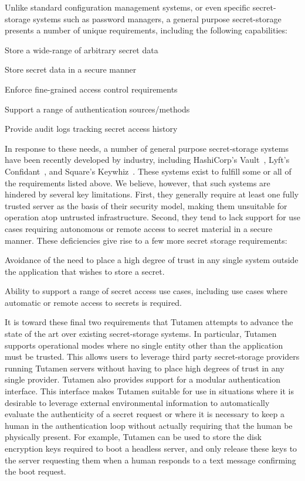 Unlike standard configuration management systems, or even specific
secret-storage systems such as password managers, a general purpose
secret-storage presents a number of unique requirements, including the
following capabilities:

\begin{packed_item}
\item Store a wide-range of arbitrary secret data
\item Store secret data in a secure manner
\item Enforce fine-grained access control requirements
\item Support a range of authentication sources/methods
\item Provide audit logs tracking secret access history
\end{packed_item}

In response to these needs, a number of general purpose secret-storage
systems have been recently developed by industry, including
HashiCorp's Vault~\cite{vault}, Lyft's Confidant~\cite{confidant}, and
Square's Keywhiz~\cite{keywhiz}. These systems exist to fulfill some
or all of the requirements listed above. We believe, however, that
such systems are hindered by several key limitations. First, they
generally require at least one fully trusted server as the basis of
their security model, making them unsuitable for operation atop
untrusted infrastructure. Second, they tend to lack support for use
cases requiring autonomous or remote access to secret material in a
secure manner. These deficiencies give rise to a few more secret
storage requirements:

\begin{packed_item}
\item Avoidance of the need to place a high degree of trust in any
  single system outside the application that wishes to store a secret.
\item Ability to support a range of secret access use cases, including
  use cases where automatic or remote access to secrets is required.
\end{packed_item}

It is toward these final two requirements that Tutamen attempts to
advance the state of the art over existing secret-storage systems. In
particular, Tutamen supports operational modes where no single entity
other than the application must be trusted. This allows users to
leverage third party secret-storage providers running Tutamen servers
without having to place high degrees of trust in any single
provider. Tutamen also provides support for a modular authentication
interface. This interface makes Tutamen suitable for use in situations
where it is desirable to leverage external environmental information
to automatically evaluate the authenticity of a secret request or
where it is necessary to keep a human in the authentication loop
without actually requiring that the human be physically present. For
example, Tutamen can be used to store the disk encryption keys
required to boot a headless server, and only release these keys to the
server requesting them when a human responds to a text message
confirming the boot request.

